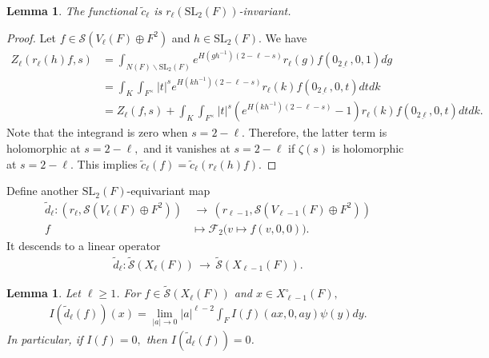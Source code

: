 \documentclass[11pt,a4paper,reqno]{amsart}
\newtheorem{lem}[thm]{Lemma}
\theoremstyle{remark}
\numberwithin{equation}{section}
\newcommand{\SL}{\mathrm{SL}}
\newcommand{\lto}{\,\longrightarrow\,}
\theoremstyle{definition}
\numberwithin{equation}{section}
\begin{document}
\begin{lem}
    The functional $\tilde{c}_\ell$ is $r_\ell(\SL_2(F))$-invariant. 
\end{lem}
\begin{proof}
   Let $f\in \mathcal{S}(V_\ell(F)\oplus F^2)$ and $h\in \SL_2(F).$ We have
    \begin{align*}
        Z_\ell(r_\ell(h)f,s)&=\int_{N(F)\backslash \SL_2(F)} e^{H(gh^{-1})(2-\ell-s)}r_\ell(g)f(0_{\underline{2\ell}},0,1)d\dot{g}\\
        &= \int_K \int_{F^\times}|t|^se^{H(kh^{-1})(2-\ell-s)}r_\ell(k)f(0_{\underline{2\ell}},0,t)dtdk\\
        &=Z_\ell(f,s)+\int_K\int_{F^\times} |t|^s\left(e^{H(kh^{-1})(2-\ell-s)}-1\right)r_\ell(k)f(0_{\underline{2\ell}},0,t) dtdk.
    \end{align*}
    Note that the integrand is zero when $s=2-\ell.$ Therefore, the latter term is holomorphic at $s=2-\ell,$ and it vanishes at $s=2-\ell$ if $\zeta(s)$ is holomorphic at $s=2-\ell$. This implies $\tilde{c}_\ell(f)=\tilde{c}_\ell(r_\ell(h)f).$
\end{proof}

Define another $\SL_2(F)$-equivariant map
\begin{align*}
    \tilde{d}_\ell:(r_\ell,\mathcal{S}(V_{\ell}(F)\oplus F^2))&\lto (r_{\ell-1},\mathcal{S}(V_{\ell-1}(F)\oplus F^2))\\
f&\longmapsto \mathcal{F}_2\big(v\mapsto f(v,0,0)\big).
\end{align*}
It  descends to a linear operator
\begin{align*}
    \tilde{d}_\ell:\widetilde{\mathcal{S}}(X_{\ell}(F))\lto \widetilde{\mathcal{S}}(X_{\ell-1}(F)).
\end{align*}

\begin{lem}\label{lem:ddescent}
    Let $\ell\ge 1$. For $f\in \widetilde{\mathcal{S}}(X_{\ell}(F))$ and $x\in X_{\ell-1}^\circ(F),$
    \begin{align*}
        I(\tilde{d}_\ell(f))(x)=\lim_{|a|\to 0} |a|^{\ell-2}\int_{F} I(f)(ax,0,ay) \psi(y)dy.
    \end{align*}
In particular, if $I(f)=0,$ then $I(\tilde{d}_\ell(f))=0$. 
\end{lem}
\end{document}
